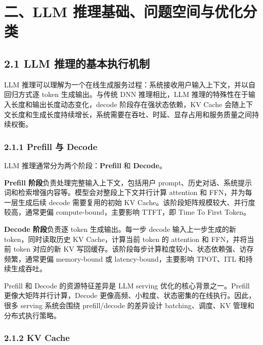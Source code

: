 \documentclass[a4paper,10pt]{ctexart}
\begin{document}
\section*{二、LLM 推理基础、问题空间与优化分类}

\subsection*{2.1 LLM 推理的基本执行机制}

LLM 推理可以理解为一个在线生成服务过程：系统接收用户输入上下文，并以自回归方式逐 token 生成输出。与传统 DNN 推理相比，LLM 推理的特殊性在于输入长度和输出长度动态变化，decode 阶段存在强状态依赖，KV Cache 会随上下文长度和生成长度持续增长，系统需要在吞吐、时延、显存占用和服务质量之间持续权衡。


\subsubsection*{2.1.1 Prefill 与 Decode}

LLM 推理通常分为两个阶段：\textbf{Prefill} 和 \textbf{Decode}。


\textbf{Prefill 阶段}负责处理完整输入上下文，包括用户 prompt、历史对话、系统提示词和检索增强内容等。模型会对整段上下文并行计算 attention 和 FFN，并为每一层生成后续 decode 需要复用的初始 KV Cache。该阶段矩阵规模较大、并行度较高，通常更偏 compute-bound，主要影响 TTFT，即 Time To First Token。


\textbf{Decode 阶段}负责逐 token 生成输出。每一步 decode 输入上一步生成的新 token，同时读取历史 KV Cache，计算当前 token 的 attention 和 FFN，并将当前 token 对应的新 KV 写回缓存。该阶段每步计算粒度较小、状态依赖强、访存频繁，通常更偏 memory-bound 或 latency-bound，主要影响 TPOT、ITL 和持续生成吞吐。


Prefill 和 Decode 的资源特征差异是 LLM serving 优化的核心背景之一。Prefill 更像大矩阵并行计算，Decode 更像高频、小粒度、状态密集的在线执行。因此，很多 serving 系统会围绕 prefill/decode 的差异设计 batching、调度、KV 管理和分布式执行策略。




\subsubsection*{2.1.2 KV Cache}
\end{document}
